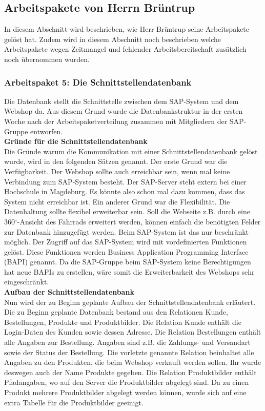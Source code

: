 \subsection{Arbeitspakete von Herrn Brüntrup}
In diesem Abschnitt wird beschrieben, wie Herr Brüntrup seine Arbeitspakete gelöst hat. Zudem wird in diesem Abschnitt noch beschrieben welche Arbeitspakete wegen Zeitmangel und fehlender Arbeitsbereitschaft zusätzlich noch übernommen wurden.

\subsubsection{Arbeitspaket 5: Die Schnittstellendatenbank}
Die Datenbank stellt die Schnittstelle zwischen dem SAP-System und dem Webshop da. Aus diesem Grund wurde die Datenbankstruktur in der ersten Woche nach der Arbeitspaketverteilung zusammen mit Mitgliedern der SAP-Gruppe entworfen.\\

\textbf{Gründe für die Schnittstellendatenbank}\\
Die Gründe warum die Kommunikation mit einer Schnittstellendatenbank gelöst wurde, wird in den folgenden Sätzen genannt. Der erste Grund war die Verfügbarkeit. Der Webshop sollte auch erreichbar sein, wenn mal keine Verbindung zum SAP-System besteht. Der SAP-Server steht extern bei einer Hochschule in Magdeburg. Es könnte also schon mal dazu kommen, dass das System nicht erreichbar ist. Ein anderer Grund war die Flexibilität. Die Datenhaltung sollte flexibel erweiterbar sein. Soll die Webseite z.B. durch eine 360$^\circ$-Ansicht des Fahrrads erweitert werden, können einfach die benötigten Felder zur Datenbank hinzugefügt werden. Beim SAP-System ist das nur beschränkt möglich. Der Zugriff auf das SAP-System wird mit vordefinierten Funktionen gelöst. Diese Funktionen werden \glqq Business Application Programming Interface (BAPI)\grqq{} genannt. Da die SAP-Gruppe beim SAP-System keine Berechtigungen hat neue BAPIs zu erstellen, wäre somit die Erweiterbarkeit des Webshops sehr eingeschränkt.\\

\textbf{Aufbau der Schnittstellendatenbank}\\
Nun wird der zu Beginn geplante Aufbau der Schnittstellendatenbank erläutert. Die zu Beginn geplante Datenbank bestand aus den Relationen \glqq Kunde\grqq{}, \glqq Bestellungen\grqq{}, \glqq Produkte\grqq{} und \glqq Produktbilder\grqq{}. Die Relation \glqq Kunde\grqq{} enthält die Login-Daten des Kunden sowie dessen Adresse. Die Relation \glqq Bestellungen\grqq{} enthält alle Angaben zur Bestellung. Angaben sind z.B. die Zahlungs- und Versandart sowie der Status der Bestellung. Die vorletzte genannte Relation beinhaltet alle Angaben zu den Produkten, die beim Webshop verkauft werden sollen. Ihr wurde deswegen auch der Name \glqq Produkte\grqq{} gegeben. Die Relation \glqq Produktbilder\grqq{} enthält Pfadangaben, wo auf den Server die Produktbilder abgelegt sind. Da zu einen Produkt mehrere Produktbilder abgelegt werden können, wurde sich auf eine extra Tabelle für die Produktbilder geeinigt.

